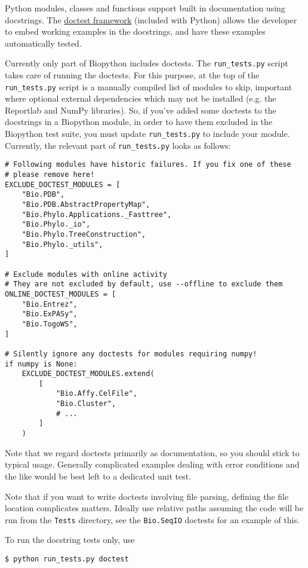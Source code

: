 Python modules, classes and functions support built in documentation using
docstrings.  The \href{https://docs.python.org/3/library/doctest.html}{doctest
framework} (included with Python) allows the developer to embed working
examples in the docstrings, and have these examples automatically tested.

Currently only part of Biopython includes doctests. The \verb|run_tests.py|
script takes care of running the doctests. For this purpose, at the top of
the \verb|run_tests.py| script is a manually compiled list of modules to
skip, important where optional external dependencies which may
not be installed (e.g. the Reportlab and NumPy libraries).  So, if you've
added some doctests to the docstrings in a Biopython module, in order to
have them excluded in the Biopython test suite, you must update
\verb|run_tests.py| to include your module. Currently, the relevant part
of \verb|run_tests.py| looks as follows:

\begin{verbatim}
# Following modules have historic failures. If you fix one of these
# please remove here!
EXCLUDE_DOCTEST_MODULES = [
    "Bio.PDB",
    "Bio.PDB.AbstractPropertyMap",
    "Bio.Phylo.Applications._Fasttree",
    "Bio.Phylo._io",
    "Bio.Phylo.TreeConstruction",
    "Bio.Phylo._utils",
]

# Exclude modules with online activity
# They are not excluded by default, use --offline to exclude them
ONLINE_DOCTEST_MODULES = [
    "Bio.Entrez",
    "Bio.ExPASy",
    "Bio.TogoWS",
]

# Silently ignore any doctests for modules requiring numpy!
if numpy is None:
    EXCLUDE_DOCTEST_MODULES.extend(
        [
            "Bio.Affy.CelFile",
            "Bio.Cluster",
            # ...
        ]
    )
\end{verbatim}

Note that we regard doctests primarily as documentation, so you should
stick to typical usage. Generally complicated examples dealing with error
conditions and the like would be best left to a dedicated unit test.

Note that if you want to write doctests involving file parsing, defining
the file location complicates matters.  Ideally use relative paths assuming
the code will be run from the \verb|Tests| directory, see the
\verb|Bio.SeqIO| doctests for an example of this.

To run the docstring tests only, use
\begin{verbatim}
$ python run_tests.py doctest
\end{verbatim}

